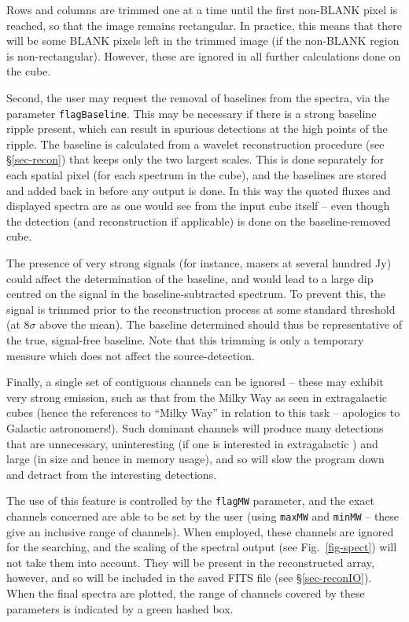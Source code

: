 Rows and columns are trimmed one at a time until the first non-BLANK
pixel is reached, so that the image remains rectangular. In practice,
this means that there will be some BLANK pixels left in the trimmed
image (if the non-BLANK region is non-rectangular). However, these are
ignored in all further calculations done on the cube.


Second, the user may request the removal of baselines from the
spectra, via the parameter \texttt{flagBaseline}. This may be
necessary if there is a strong baseline ripple present, which can
result in spurious detections at the high points of the ripple. The
baseline is calculated from a wavelet reconstruction procedure (see
\S\ref{sec-recon}) that keeps only the two largest scales. This is
done separately for each spatial pixel (\ie for each spectrum in the
cube), and the baselines are stored and added back in before any
output is done. In this way the quoted fluxes and displayed spectra
are as one would see from the input cube itself -- even though the
detection (and reconstruction if applicable) is done on the
baseline-removed cube.

The presence of very strong signals (for instance, masers at several
hundred Jy) could affect the determination of the baseline, and would
lead to a large dip centred on the signal in the baseline-subtracted
spectrum. To prevent this, the signal is trimmed prior to the
reconstruction process at some standard threshold (at $8\sigma$ above
the mean). The baseline determined should thus be representative of
the true, signal-free baseline. Note that this trimming is only a
temporary measure which does not affect the source-detection.


Finally, a single set of contiguous channels can be ignored -- these
may exhibit very strong emission, such as that from the Milky Way as
seen in extragalactic \hi cubes (hence the references to ``Milky
Way'' in relation to this task -- apologies to Galactic
astronomers!). Such dominant channels will produce many detections
that are unnecessary, uninteresting (if one is interested in
extragalactic \hi) and large (in size and hence in memory usage), and
so will slow the program down and detract from the interesting
detections. 

The use of this feature is controlled by the \texttt{flagMW}
parameter, and the exact channels concerned are able to be set by the
user (using \texttt{maxMW} and \texttt{minMW} -- these give an
inclusive range of channels). When employed, these channels are
ignored for the searching, and the scaling of the spectral output (see
Fig.~\ref{fig-spect}) will not take them into account. They will be
present in the reconstructed array, however, and so will be included
in the saved FITS file (see \S\ref{sec-reconIO}). When the final
spectra are plotted, the range of channels covered by these parameters
is indicated by a green hashed box.

